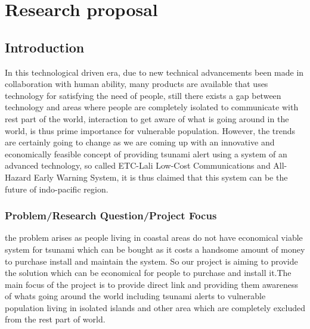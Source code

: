 
\chapter{Research proposal}\label{chapter:firstchapter} %

\label{ChapterX} %


\section{Introduction}\label{sec:firstsection}


In this technological driven era, due to new technical advancements been made in collaboration with human ability, many products are available that uses technology for satisfying the need of people, still there exists a gap between technology and areas where people are completely isolated to communicate with rest part of the world, interaction to get aware of what is going around in the world, is thus prime importance for vulnerable population. However, the trends are certainly going to change as we are coming up with an innovative and economically feasible concept of providing tsunami alert using a system of an advanced technology, so called ETC-Lali Low-Cost Communications and All-Hazard Early Warning System, it is thus claimed that this system can be the future of indo-pacific region.

\begin{figure}
\begin{centering}


\label{fig:ThisFig}
\end{centering}
\end{figure}

\subsection{Problem/Research Question/Project Focus  }
the problem arises as people living in coastal areas do not have economical viable system for tsunami which can be  bought as it costs a handsome amount of money to purchase install and maintain the system. So our project is aiming to provide the solution which can be economical for people to purchase and install it.The main focus of the project is to provide direct link and providing them awareness of whats going around the world including tsunami alerts to vulnerable population living in isolated islands and other area which are completely excluded from the rest part of world.\\

